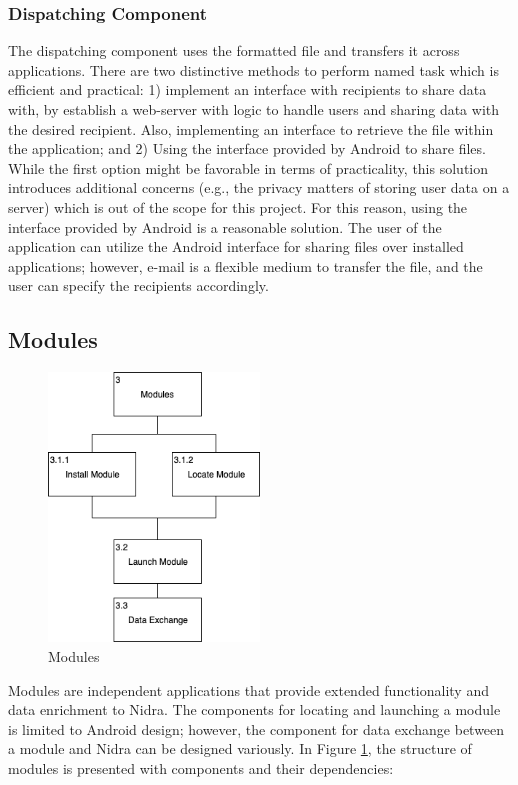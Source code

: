 \subsubsection{Dispatching Component}
The dispatching component uses the formatted file and transfers it across applications. There are two distinctive methods to perform named task which is efficient and practical: 1) implement an interface with recipients to share data with, by establish a web-server with logic to handle users and sharing data with the desired recipient. Also, implementing an interface to retrieve the file within the application;  and 2) Using the interface provided by Android to share files. While the first option might be favorable in terms of practicality, this solution introduces additional concerns (e.g., the privacy matters of storing user data on a server) which is out of the scope for this project. For this reason, using the interface provided by Android is a reasonable solution. The user of the application can utilize the Android interface for sharing files over installed applications; however, e-mail is a flexible medium to transfer the file, and the user can specify the recipients accordingly.  


\subsection{Modules}

\begin{figure}
    \centering
    \includegraphics[width=0.5\textwidth]{images/Modules.png}
    \caption{Modules}
    \label{fig:hta_modules}
\end{figure}

Modules are independent applications that provide extended functionality and data enrichment to Nidra. The components for locating and launching a module is limited to Android design; however, the component for data exchange between a module and Nidra can be designed variously.  In Figure \ref{fig:hta_modules}, the structure of modules is presented with components and their dependencies:   

